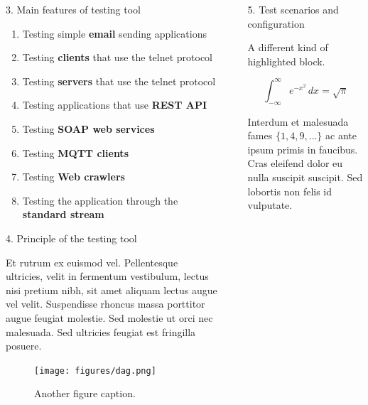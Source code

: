 \documentclass[final]{beamer}
\newlength{\sepwidth}
\newlength{\colwidth}
\newcommand{\separatorcolumn}{\begin{column}{\sepwidth}\end{column}}
\begin{document}
\begin{frame}[t]
\begin{columns}[t]
\begin{column}{\colwidth}
\begin{alertblock}{3. Main features of testing tool}
    \begin{enumerate}
      \item Testing simple \textbf{email} sending applications
      \item Testing \textbf{clients} that use the telnet protocol
      \item Testing \textbf{servers} that use the telnet protocol
      \item Testing applications that use \textbf{REST API}
      \item Testing \textbf{SOAP web services}
      \item Testing \textbf{MQTT clients}
      \item Testing \textbf{Web crawlers}
      \item Testing the application through the \textbf{standard stream}
    \end{enumerate}

  \end{alertblock}

  \begin{block}{4. Principle of the testing tool}

    Et rutrum ex euismod vel. Pellentesque ultricies, velit in fermentum
    vestibulum, lectus nisi pretium nibh, sit amet aliquam lectus augue vel
    velit. Suspendisse rhoncus massa porttitor augue feugiat molestie. Sed
    molestie ut orci nec malesuada. Sed ultricies feugiat est fringilla
    posuere.

    \begin{figure}
      \centering
        \texttt{[image: figures/dag.png]}

      \caption{Another figure caption.}
    \end{figure}

  \end{block}

\end{column}

\separatorcolumn

\begin{column}{\colwidth}

  \begin{block}{5. Test scenarios and configuration}

    A different kind of highlighted block.

    $$
    \int_{-\infty}^{\infty} e^{-x^2}\,dx = \sqrt{\pi}
    $$

    Interdum et malesuada fames $\{1, 4, 9, \ldots\}$ ac ante ipsum primis in
    faucibus. Cras eleifend dolor eu nulla suscipit suscipit. Sed lobortis non
    felis id vulputate.


\end{block}
\end{column}
\end{columns}
\end{frame}
\end{document}
